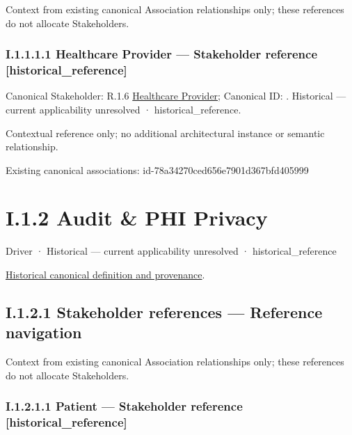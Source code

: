 Context from existing canonical Association relationships only; these references do not allocate Stakeholders.\par
\subsubsection*{I.1.1.1.1 Healthcare Provider — Stakeholder reference [historical\_reference]}
\label{navigation:I.1.1.1.1}

{\small Canonical Stakeholder: R.1.6 \hyperref[element:2018200a493d458096b72031cc2ae779]{Healthcare Provider}; Canonical ID: \texttt{}. Historical — current applicability unresolved · historical\_reference.}\par
Contextual reference only; no additional architectural instance or semantic relationship.\par
Existing canonical associations: id-78a34270ced656e7901d367bfd405999\par
\section*{I.1.2 Audit \& PHI Privacy}
\label{navigation:I.1.2}

\label{element:499313a0a5d84520a3061120ae9b6dac}
{\small Driver · Historical — current applicability unresolved · historical\_reference}\par
\href{../../../../continuum/motivation/driver/499313a0a5d84520a3061120ae9b6dac.md}{Historical canonical definition and provenance}.\par
\subsection*{I.1.2.1 Stakeholder references — Reference navigation}
\label{navigation:I.1.2.1}

Context from existing canonical Association relationships only; these references do not allocate Stakeholders.\par
\subsubsection*{I.1.2.1.1 Patient — Stakeholder reference [historical\_reference]}
\label{navigation:I.1.2.1.1}

